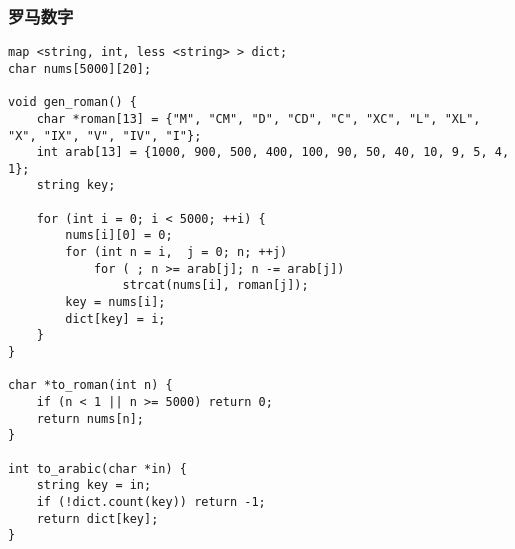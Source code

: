 \subsubsection{罗马数字}
\begin{verbatim}
map <string, int, less <string> > dict;
char nums[5000][20];

void gen_roman() {
    char *roman[13] = {"M", "CM", "D", "CD", "C", "XC", "L", "XL", "X", "IX", "V", "IV", "I"};
    int arab[13] = {1000, 900, 500, 400, 100, 90, 50, 40, 10, 9, 5, 4, 1};
    string key;

    for (int i = 0; i < 5000; ++i) {
        nums[i][0] = 0;
        for (int n = i,  j = 0; n; ++j)
            for ( ; n >= arab[j]; n -= arab[j]) 
                strcat(nums[i], roman[j]);
        key = nums[i];
        dict[key] = i;
    }
}

char *to_roman(int n) {
    if (n < 1 || n >= 5000) return 0;
    return nums[n];
}

int to_arabic(char *in) {
    string key = in;
    if (!dict.count(key)) return -1;
    return dict[key];
}
\end{verbatim}
